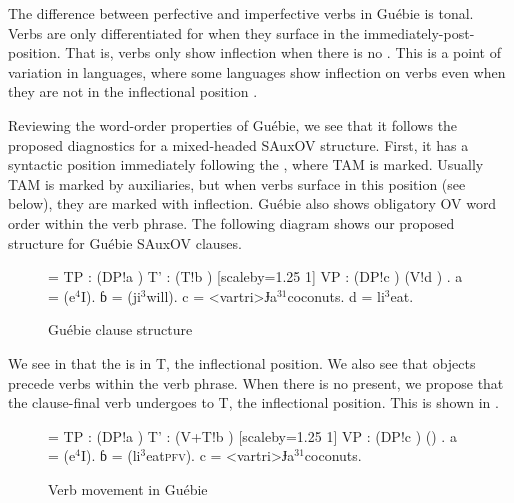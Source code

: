\documentclass[output=paper,newtxmath,modfonts,nonflat,draftmode]{langsci/langscibook}
\begin{document}
The difference between perfective and imperfective verbs in Guébie is tonal. Verbs are only differentiated for  when they surface in the immediately-post- position. That is, verbs only show inflection when there is no . This is a point of variation in  languages, where some languages show inflection on verbs even when they are not in the inflectional position \citep{Marchese1979,Koopman:1984}.

Reviewing the word-order properties of Guébie, we see that it follows the proposed diagnostics for a mixed-headed SAuxOV structure. First, it has a syntactic  position immediately following the , where TAM is marked. Usually TAM is marked by auxiliaries, but when verbs surface in this position (see below), they are marked with inflection. Guébie also shows obligatory OV word order within the verb phrase. The following diagram shows our proposed structure for Guébie SAuxOV clauses.

\begin{figure}
\jtree[xunit=2.5em,yunit=1.25em]
\! = {TP}
: ({DP}!a ) {T'}
: ({T}!b ) [scaleby=1.25 1] {VP}
: ({DP}!c ) ({V}!d ) .
\!a = ({e$^{4}$}{I}).
ɓ = ({ji$^{3}$}{will}).
\!c = <vartri>{{Ɉ{}a}$^{31}$}{coconuts}.
\!d = {li$^{3}$}{eat}.
\endjtree
\caption{Guébie clause structure \citep[cf.][]{Sande:2017}} \label{fig:sande:Guebie}
\end{figure}

We see in  that the  is in T, the inflectional position. We also see that objects precede verbs within the verb phrase. %
When there is no  present, we propose that the clause-final verb undergoes  to T, the inflectional position. This is shown in .

\begin{figure} 
	
\jtree[xunit=2.5em,yunit=1.25em]
\! = {TP}
: ({DP}!a ) {T'}
: ({V+T}!b ) [scaleby=1.25 1] {VP}
: ({DP}!c ) ({}) .
\!a = ({e$^{4}$}{I}).
ɓ = ({li$^{3}$}{eat\textsc{pfv}}).
\!c = <vartri>{{Ɉ{}a}$^{31}$}{coconuts}.
 \hspace{12pt}
\endjtree
\vspace{6pt}
\caption{Verb movement in Guébie \citep[cf.][]{Koopman:1984, Sande:2017}} \label{fig:sande:Guebieverbmove}
\end{figure}
\end{document}
